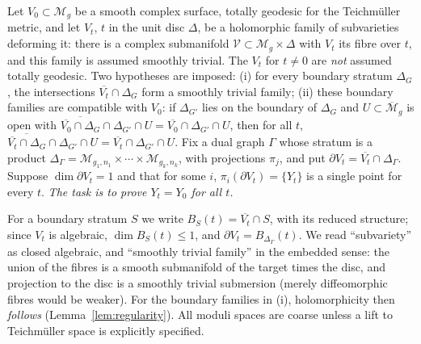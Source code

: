 \documentclass[11pt]{article}
\newcommand{\M}{\mathcal M}
\newcommand{\cl}[1]{\overline{#1}}
\theoremstyle{remark}
\begin{document}
Let \(V_0\subset\M_g\) be a smooth complex surface, totally geodesic
for the Teichm\"uller metric, and let \(V_t\), \(t\) in the unit disc
\(\Delta\), be a holomorphic family of subvarieties deforming it:
there is a complex submanifold \(\mathcal V\subset\M_g\times\Delta\)
with \(V_t\) its fibre over \(t\), and this family is assumed smoothly
trivial. The \(V_t\) for \(t\ne0\) are \emph{not} assumed totally
geodesic. Two hypotheses are imposed:
(i) for every boundary stratum \(\Delta_G\), the intersections
\(\cl{V_t}\cap\Delta_G\) form a smoothly trivial family;
(ii) these boundary families are compatible with \(V_0\): if
\(\Delta_{G'}\) lies on the boundary of \(\Delta_G\) and
\(U\subset\cl{\M}_g\) is open with
\(\cl{\cl{V_0}\cap\Delta_G}\cap\Delta_{G'}\cap U
   =\cl{V_0}\cap\Delta_{G'}\cap U\),
then for all \(t\),
\(\cl{\cl{V_t}\cap\Delta_G}\cap\Delta_{G'}\cap U
   =\cl{V_t}\cap\Delta_{G'}\cap U\).
Fix a dual graph \(\Gamma\) whose stratum is a product
\(\Delta_\Gamma=\M_{g_1,n_1}\times\cdots\times\M_{g_k,n_k}\), with
projections \(\pi_j\), and put \(\partial V_t=\cl{V_t}\cap\Delta_\Gamma\).
Suppose \(\dim\partial V_t=1\) and that for some \(i\),
\(\pi_i(\partial V_t)=\{Y_t\}\) is a single point for every \(t\).
\emph{The task is to prove \(Y_t=Y_0\) for all \(t\).}

For a boundary stratum \(S\) we write \(B_S(t)=\cl{V_t}\cap S\),
with its reduced structure; since \(V_t\) is algebraic,
\(\dim B_S(t)\le1\), and \(\partial V_t=B_{\Delta_\Gamma}(t)\).
We read ``subvariety'' as closed algebraic, and ``smoothly trivial
family'' in the embedded sense: the union of the fibres is a smooth
submanifold of the target times the disc, and projection to the
disc is a smoothly trivial submersion (merely diffeomorphic fibres
would be weaker).
For the boundary families in (i), holomorphicity then
\emph{follows} (Lemma~\ref{lem:regularity}). All moduli spaces are
coarse unless a lift to Teichm\"uller space is explicitly specified.
\end{document}
